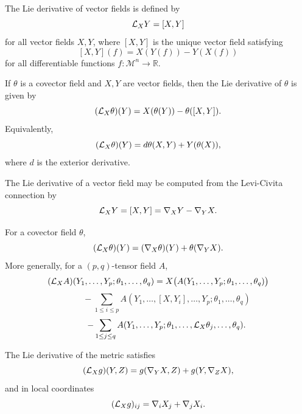 \begin{definition}
\label{appa-def-lie-derivative-vector}
The Lie derivative of vector fields is defined by
\[
\mathcal{L}_X Y=[X,Y]
\]
for all vector fields \(X,Y\), where \([X,Y]\) is the unique vector field satisfying
\[
[X,Y](f)=X(Y(f))-Y(X(f))
\]
for all differentiable functions \(f:\mathcal M^n\to\mathbb R\).
\end{definition}

\begin{definition}
\label{appa-def-lie-derivative-covector}
If \(\theta\) is a covector field and \(X,Y\) are vector fields, then the Lie derivative of \(\theta\) is given by
\[
(\mathcal{L}_X \theta)(Y)=X(\theta(Y))-\theta([X,Y]).
\]
Equivalently,
\[
(\mathcal{L}_X \theta)(Y)=d\theta(X,Y)+Y(\theta(X)),
\]
where \(d\) is the exterior derivative.
\end{definition}

\begin{remark}
\label{appa-rem-lie-bracket-via-connection}
The Lie derivative of a vector field may be computed from the Levi-Civita connection by
\[
\mathcal{L}_XY=[X,Y]=\nabla_XY-\nabla_YX.
\]
\end{remark}

\begin{remark}
\label{appa-rem-lie-derivative-tensors}
For a covector field \(\theta\),
\[
(\mathcal{L}_X \theta)(Y)=(\nabla_X\theta)(Y)+\theta(\nabla_YX).
\]
More generally, for a \((p,q)\)-tensor field \(A\),
\[
(\mathcal{L}_X A)(Y_1,\ldots,Y_p;\theta_1,\ldots,\theta_q)
=X\bigl(A(Y_1,\ldots,Y_p;\theta_1,\ldots,\theta_q)\bigr)
\]
\[
\qquad - \sum_{1\le i\le p} A(Y_1,\ldots,[X,Y_i],\ldots,Y_p;\theta_1,\ldots,\theta_q)
\]
\[
\qquad - \sum_{1\le j\le q} A(Y_1,\ldots,Y_p;\theta_1,\ldots,\mathcal{L}_X\theta_j,\ldots,\theta_q).
\]
\end{remark}

\begin{remark}
\label{appa-rem-lie-derivative-metric}
The Lie derivative of the metric satisfies
\[
(\mathcal{L}_X g)(Y,Z)=g(\nabla_YX,Z)+g(Y,\nabla_ZX),
\]
and in local coordinates
\[
(\mathcal{L}_X g)_{ij}=\nabla_i X_j+\nabla_j X_i.
\]
\end{remark}

